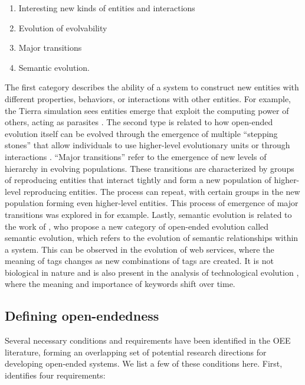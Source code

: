 \begin{enumerate}
  \item Interesting new kinds of entities and interactions
  \item Evolution of evolvability
  \item Major transitions
  \item Semantic evolution.
\end{enumerate}

The first category describes the ability of a system to construct new entities
with different properties, behaviors, or interactions with other entities. For
example, the Tierra simulation sees entities emerge that exploit the computing
power of others, acting as parasites \parencite{rayApproachSynthesisLife1991}.
The second type is related to how open-ended evolution itself can be evolved
through the emergence of multiple ``stepping stones'' that allow individuals to use higher-level evolutionary units or through interactions
\parencite{patteeEvolvedOpenEndednessNot2019}. ``Major transitions'' refer to
the emergence of new levels of hierarchy in evolving populations. These
transitions are characterized by groups of reproducing entities that
interact tightly and form a new population of higher-level reproducing entities.
The process can repeat, with certain groups in the new population forming even
higher-level entities. This process of emergence of major transitions was
explored in \parencite{sayamaCardinalityLeapOpenEnded2019,
  morenoOpenEndedFraternalTransitions2019} for example. Lastly, semantic
evolution is related to the work of
\textcite{ikegamiOpenEndedEvolutionMechanism2019}, who propose a new category of
open-ended evolution called semantic evolution, which refers to the evolution of
semantic relationships within a system. This can be observed in the evolution of
web services, where the meaning of tags changes as new combinations of tags are
created. It is not biological in nature and is also present in the analysis of
technological evolution \parencite{bedauOpenEndedTechnologicalInnovation2019},
where the meaning and importance of keywords shift over time.

\subsection{Defining open-endedness}

Several necessary conditions and requirements have been identified in the
\ac{OEE} literature, forming an overlapping set of potential research
directions for developing open-ended systems. We list a few of these conditions
here. First, \textcite{maleyFourStepsOpenended1999} identifies four requirements:

